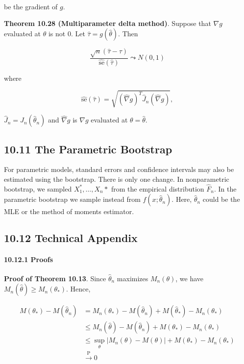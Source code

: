 be the gradient of \(g\).

\textbf{Theorem 10.28 (Multiparameter delta method)}. Suppose that
\(\nabla g\) evaluated at \(\hat{\theta}\) is not 0. Let
\(\hat{\tau} = g(\hat{\theta})\). Then

\[ \frac{\sqrt{n}(\hat{\tau} - \tau)}{\hat{\text{se}}(\hat{\tau})} \leadsto N(0, 1) \]

where

\[ \hat{\text{se}}(\hat{\tau}) = \sqrt{\left(\hat{\nabla} g \right)^T \hat{J}_n \left(\hat{\nabla} g \right)} ,\]

\(\hat{J}_n = J_n(\hat{\theta}_n)\) and \(\hat{\nabla}g\) is
\(\nabla g\) evaluated at \(\theta = \hat{\theta}\).

\subsection{10.11 The Parametric
Bootstrap}\label{the-parametric-bootstrap}

For parametric models, standard errors and confidence intervals may also
be estimated using the bootstrap. There is only one change. In
nonparametric bootstrap, we sampled \(X_1^*, \dots, X_n*\) from the
empirical distribution \(\hat{F}_n\). In the parametric bootstrap we
sample instead from \(f(x; \hat{\theta}_n)\). Here, \(\hat{\theta}_n\)
could be the MLE or the method of moments estimator.

\subsection{10.12 Technical Appendix}\label{technical-appendix}

\paragraph{10.12.1 Proofs}\label{proofs}

\textbf{Proof of Theorem 10.13}. Since \(\hat{\theta}_n\) maximizes
\(M_n(\theta)\), we have \(M_n(\hat{\theta}) \geq M_n(\theta_*)\).
Hence,

\begin{align}
M(\theta_*) - M(\hat{\theta}_n) 
&= M_n(\theta_*) - M(\hat{\theta}_n) + M(\hat{\theta}_*) - M_n(\theta_*) \\
&\leq M_n(\hat{\theta}) - M(\hat{\theta}_n) + M(\theta_*) - M_n(\theta_*) \\
&\leq \sup_\theta | M_n(\theta) - M(\theta) |  + M(\theta_*)  - M_n(\theta_*) \\
&\xrightarrow{\text{P}} 0
\end{align}

